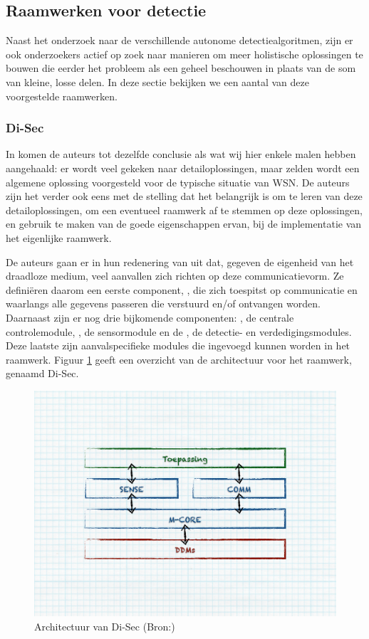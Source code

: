
\subsection{Raamwerken voor detectie}
\label{subsection:frameworks}

Naast het onderzoek naar de verschillende autonome detectiealgoritmen, zijn er
ook onderzoekers actief op zoek naar manieren om meer holistische oplossingen
te bouwen die eerder het probleem als een geheel beschouwen in plaats van de
som van kleine, losse delen. In deze sectie bekijken we een aantal van deze
voorgestelde raamwerken.

\subsubsection*{Di-Sec}
\label{subsubsection:di-sec}

In \citep{valero2012di} komen de auteurs tot dezelfde conclusie als wat wij
hier enkele malen hebben aangehaald: er wordt veel gekeken naar
detailoplossingen, maar zelden wordt een algemene oplossing voorgesteld voor de
typische situatie van WSN. De auteurs zijn het verder ook eens met de stelling
dat het belangrijk is om te leren van deze detailoplossingen, om een eventueel
raamwerk af te stemmen op deze oplossingen, en gebruik te maken van de goede
eigenschappen ervan, bij de implementatie van het eigenlijke raamwerk.

De auteurs gaan er in hun redenering van uit dat, gegeven de eigenheid van het
draadloze medium, veel aanvallen zich richten op deze communicatievorm. Ze
defini\"eren daarom een eerste component, , die zich toespitst op
communicatie en waarlangs alle gegevens passeren die verstuurd en/of ontvangen
worden. Daarnaast zijn er nog drie bijkomende componenten: , de
centrale controlemodule, , de sensormodule en de , de
detectie- en verdedigingsmodules. Deze laatste zijn aanvalspecifieke modules
die ingevoegd kunnen worden in het raamwerk. Figuur
\ref{fig:di-sec-architecture} geeft een overzicht van de architectuur voor het
raamwerk, genaamd Di-Sec.

\begin{figure}[ht]
  \centering
  \includegraphics[width=0.8\linewidth]{resources/di-sec-architecture.pdf}
  \caption[Architectuur van Di-Sec]{Architectuur van Di-Sec (Bron:\citep{valero2012di})}
  \label{fig:di-sec-architecture}
\end{figure}

